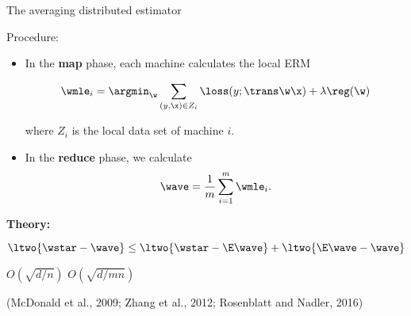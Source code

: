 \begin{frame}{The averaging distributed estimator}

Procedure:

\begin{itemize}


\item In the \textbf{map} phase, each machine calculates the local ERM

\begin{equation}
\wmle_i = \argmin_{\w} \sum_{(y,\x)\in Z_i} \loss(y;\trans\w\x) + \lambda\reg(\w)
\end{equation}

where $Z_i$ is the local data set of machine $i$.


\item
In the \textbf{reduce} phase, we calculate
\begin{equation}
\wave = \frac{1}{m}\sum_{i=1}^m \wmle_i
.
\end{equation}

\end{itemize}

\textbf{Theory:}

\vspace{-0.2in}
\begin{equation}
\ltwo{\wstar-\wave} \le 
\ltwo{\wstar-\E\wave} 
+
\ltwo{\E\wave-\wave} 
\end{equation}

\hspace{1.9in}
$O(\sqrt{d/n})$
\hspace{0.3in}
$O(\sqrt{d/mn})$

\vspace{0.15in}
(McDonald et al., 2009; Zhang et al., 2012; Rosenblatt and Nadler, 2016)
\end{frame}


